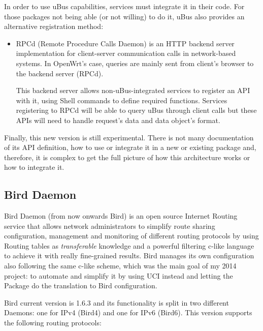 In order to use uBus capabilities, services must integrate it in their code. For those packages not being able (or not willing) to do it, uBus also provides an alternative registration method:
\begin{itemize}
    \item RPCd (Remote Procedure Calls Daemon) is an HTTP backend server implementation for client-server communication calls in network-based systems. In OpenWrt's case, queries are mainly sent from client's browser to the backend server (RPCd).
    
    This backend server allows non-uBus-integrated services to register an API with it, using Shell commands to define required functions. Services registering to RPCd will be able to query uBus through client calls but these APIs will need to handle request's data and data object's format.
\end{itemize}

Finally, this new version is still experimental. There is not many documentation of its API definition, how to use or integrate it in a new or existing package and, therefore, it is complex to get the full picture of how this architecture works or how to integrate it. 

\subsection{Bird Daemon}
Bird Daemon (from now onwards Bird)\cite{bird} is an open source Internet Routing service that allows network administrators to simplify route sharing configuration, management and monitoring of different routing protocols by using Routing tables as \textit{transferable} knowledge and a powerful filtering c-like language to achieve it with really fine-grained results. Bird manages its own configuration also following the same c-like scheme, which was the main goal of my 2014 project: to automate and simplify it by using UCI instead and letting the Package do the translation to Bird configuration.

Bird current version is 1.6.3 and its functionality is split in two different Daemons: one for IPv4 (Bird4) and one for IPv6 (Bird6). This version supports the following routing protocols:

